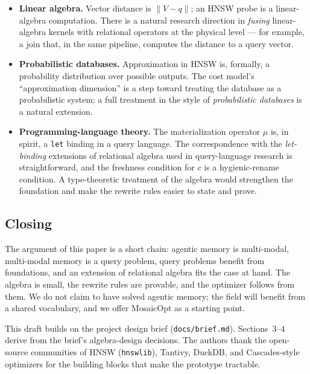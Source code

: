 \documentclass[sigconf,nonacm,review]{acmart}
\theoremstyle{plain}
\theoremstyle{definition}
\theoremstyle{remark}
\begin{document}
\begin{itemize}[leftmargin=*]
  \item \textbf{Linear algebra.} Vector distance is
    $\lVert V-q \rVert$; an HNSW probe is a linear-algebra
    computation. There is a natural research direction in
    \emph{fusing} linear-algebra kernels with relational operators
    at the physical level --- for example, a join that, in the same
    pipeline, computes the distance to a query vector.
  \item \textbf{Probabilistic databases.} Approximation in HNSW is,
    formally, a probability distribution over possible outputs. The
    cost model's ``approximation dimension'' is a step toward
    treating the database as a probabilistic system; a full
    treatment in the style of \emph{probabilistic databases}
    \cite{dalvi2007} is a natural extension.
  \item \textbf{Programming-language theory.} The materialization
    operator $\mu$ is, in spirit, a \texttt{let} binding in a query
    language. The correspondence with the \emph{let-binding}
    extensions of relational algebra used in query-language research
    is straightforward, and the freshness condition for $c$ is
    a hygienic-rename condition. A type-theoretic treatment of the
    algebra would strengthen the foundation and make the rewrite
    rules easier to state and prove.
\end{itemize}

\subsection{Closing}\label{sec:discuss:closing}

The argument of this paper is a short chain: agentic memory is
multi-modal, multi-modal memory is a query problem, query problems
benefit from foundations, and an extension of relational algebra
fits the case at hand. The algebra is small, the rewrite rules
are provable, and the optimizer follows from them. We do not claim
to have solved agentic memory; the field will benefit from a
shared vocabulary, and we offer MosaicOpt as a starting point.

\begin{acks}
This draft builds on the project design brief
(\texttt{docs/brief.md}). Sections~3--4 derive from the brief's
algebra-design decisions. The authors thank the open-source
communities of HNSW (\texttt{hnswlib}), Tantivy, DuckDB, and
Cascades-style optimizers for the building blocks that make the
prototype tractable.
\end{acks}
\end{document}
